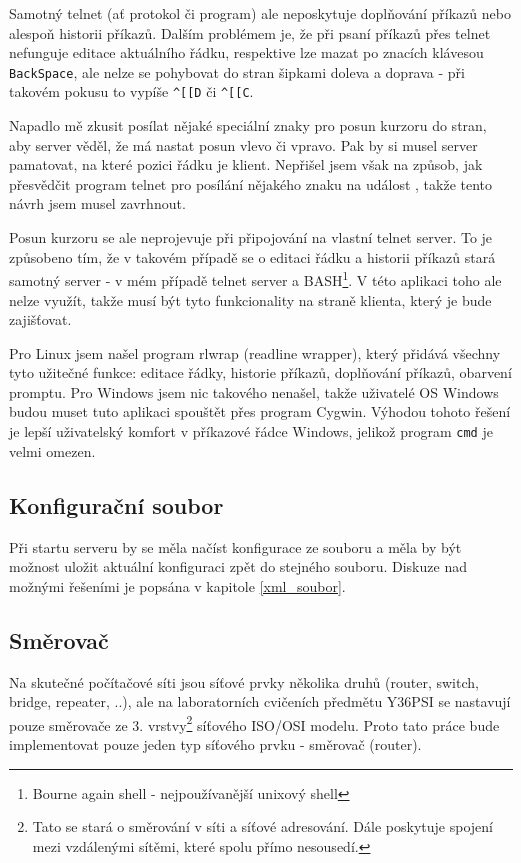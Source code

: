 Samotný telnet (ať protokol či program) ale neposkytuje doplňování příkazů nebo alespoň historii příkazů. Dalším problémem je, že při psaní příkazů přes telnet nefunguje editace aktuálního řádku, respektive lze mazat po znacích klávesou \verb|BackSpace|, ale nelze se pohybovat do stran šipkami doleva a doprava - při takovém pokusu to vypíše \verb|^[[D| či \verb|^[[C|. 

Napadlo mě zkusit posílat nějaké speciální znaky pro posun kurzoru do stran, aby server věděl, že má nastat posun vlevo či vpravo. Pak by si musel server pamatovat, na které pozici řádku je klient. Nepřišel jsem však na způsob, jak přesvědčit program telnet pro posílání nějakého znaku na událost , takže tento návrh jsem musel zavrhnout.

Posun kurzoru se ale neprojevuje při připojování na vlastní telnet server. To je způsobeno tím, že v takovém případě se o editaci řádku a historii příkazů stará samotný server - v mém případě telnet server a BASH\footnote{Bourne again shell - nejpoužívanější unixový shell}. V této aplikaci toho ale nelze využít, takže musí být tyto funkcionality na straně klienta, který je bude zajišťovat. 

Pro Linux jsem našel program rlwrap (readline wrapper), který přidává všechny tyto užitečné funkce: editace řádky, historie příkazů, doplňování příkazů, obarvení promptu. Pro Windows jsem nic takového nenašel, takže uživatelé OS Windows budou muset tuto aplikaci spouštět přes program Cygwin. Výhodou tohoto řešení je lepší uživatelský komfort v příkazové řádce Windows, jelikož program \verb|cmd| je velmi omezen.


\subsection{Konfigurační soubor}
Při startu serveru by se měla načíst konfigurace ze souboru a měla by být možnost uložit aktuální konfiguraci zpět do stejného souboru. Diskuze nad možnými řešeními je popsána v kapitole \ref{xml_soubor}.


\subsection{Směrovač}
Na skutečné počítačové síti jsou síťové prvky několika druhů (router, switch, bridge, repeater, ..), ale na laboratorních cvičeních předmětu Y36PSI se  nastavují pouze směrovače ze 3. vrstvy\footnote{Tato  se stará o směrování v síti a síťové adresování. Dále poskytuje spojení mezi vzdálenými sítěmi, které spolu přímo nesousedí.} síťového ISO/OSI modelu. Proto tato práce bude implementovat pouze jeden typ síťového prvku - směrovač (router). 

